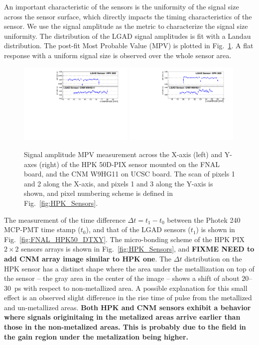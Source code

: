 \documentclass[preprint,1p]{elsarticle}
\begin{document}
An important characteristic of the sensors is the uniformity of the signal size
across the sensor surface, which directly impacts the timing characteristics of
the sensor. We use the signal amplitude as the metric to characterize the signal
size uniformity. The distribution of the LGAD signal amplitudes is fit with a
Landau distribution. The post-fit Most Probable Value (MPV) is plotted in
Fig.~\ref{fig:FNAL_HPK50_MPVXY}. A flat response with a uniform signal size is
observed over the whole sensor area.

\begin{figure}[htbp] 
\centering
\includegraphics[width=0.49\textwidth]{figs/HPK50DVsCNM_MPV_vs_X.pdf} 
\includegraphics[width=0.49\textwidth]{figs/HPK50DVsCNM_MPV_vs_Y.pdf} 
\caption{Signal amplitude MPV measurement across the X-axis (left) and Y-axes (right) of the HPK 50D-PIX sensor mounted on the FNAL board, and the CNM W9HG11 on UCSC board. The scan of pixels 1 and 2 along the X-axis, and pixels 1 and 3 along the Y-axis is shown, and pixel numbering scheme is defined in Fig.~\ref{fig:HPK_Sensors}.} 
\label{fig:FNAL_HPK50_MPVXY} 
\end{figure} 


The measurement of the time difference $\Delta t = t_{1}-t_{0}$ between the
Photek 240 MCP-PMT time stamp ($t_0$), and that of the LGAD sensors ($t_1$) is
shown in Fig.~\ref{fig:FNAL_HPK50_DTXY}. The micro-bonding scheme of the HPK PIX
$2\times 2$ sensors arrays is shown in Fig.~\ref{fig:HPK_Sensors}, and \textbf
{FIXME NEED to add CNM array image similar to HPK one}. The $\Delta t$
distribution on the HPK sensor has a distinct shape where the area under the
metallization on top of the sensor -- the gray area in the center of the image
-- shows a shift of about $20$--$30$~ps with respect to non-metallized area. A
possible explanation for this small effect is an observed slight difference in
the rise time of pulse from the metallized and un-metallized areas. \textbf
{Both HPK and CNM sensors exhibit a behavior where signals originitaing in the
metalized areas arrive earlier than those in the non-metalized areas. This is
probably due to the field in the gain region under the metalization being
higher. }
\end{document}
